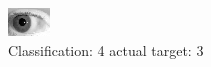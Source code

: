 \begin{figure}[h!]
\begin{center}
\includegraphics[width=0.60\columnwidth]{figures/ID178_class_4_target_3.png}
\end{center}
\caption{ Classification: 4 actual target: 3}
\label{fig:ID178_class_4_target_3}
\end{figure}

